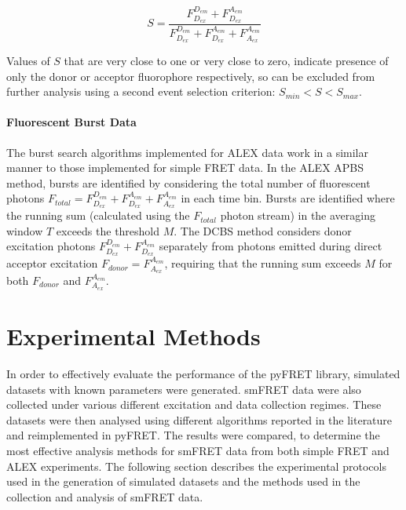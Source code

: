 \begin{equation}
S = \frac{F_{D_{ex}}^{D_{em}} + F_{D_{ex}}^{A_{em}}}{F_{D_{ex}}^{D_{em}} + F_{D_{ex}}^{A_{em}} + F_{A_{ex}}^{A_{em}}}
\label{eq:stoichiometry}
\end{equation}

Values of $S$  that are very close to one or very close to zero, indicate presence of only the donor or acceptor fluorophore respectively, so can be excluded from further analysis using a second event selection criterion: $S_{min} < S < S_{max}$. 

\paragraph{Fluorescent Burst Data}
The burst search algorithms implemented for ALEX data work in a similar manner to those implemented for simple FRET data. In the ALEX APBS method, bursts are identified by considering the total number of fluorescent photons $F_{total} = F_{D_{ex}}^{D_{em}} + F_{D_{ex}}^{A_{em}} + F_{A_{ex}}^{A_{em}}$ in each time bin. Bursts are identified where the running sum (calculated using the  $F_{total}$ photon stream) in the averaging window $T$ exceeds the threshold $M$. The DCBS method considers donor excitation photons $F_{D_{ex}}^{D_{em}} + F_{D_{ex}}^{A_{em}}$ separately from photons emitted during direct acceptor excitation $F_{donor} = F_{A_{ex}}^{A_{em}}$, requiring that the running sum exceeds $M$ for both $F_{donor}$ and $F_{A_{ex}}^{A_{em}}$.


\section{Experimental Methods}
In order to effectively evaluate the performance of the pyFRET library, simulated datasets with known parameters were generated. smFRET data were also collected under various different excitation and data collection regimes. These datasets were then analysed using different algorithms reported in the literature and reimplemented in pyFRET. The results were compared, to determine the most effective analysis methods for smFRET data from both simple FRET and ALEX experiments. The following section describes the experimental protocols used in the generation of simulated datasets and the methods used in the collection and analysis of smFRET data.

